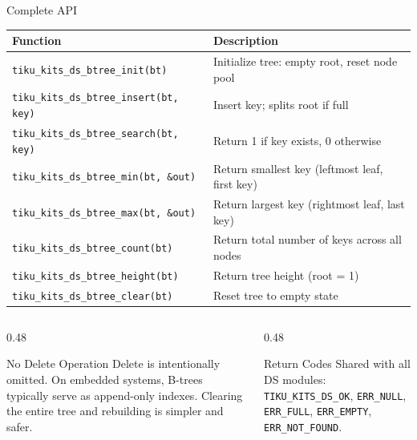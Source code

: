 \documentclass[aspectratio=169, 10pt]{beamer}
\begin{document}
\begin{frame}[fragile]{Complete API}
\begin{table}
\centering
\small
\begin{tabular}{@{}lp{8cm}@{}}
\toprule
\textbf{Function} & \textbf{Description} \\
\midrule
\texttt{tiku\_kits\_ds\_btree\_init(bt)}
  & Initialize tree: empty root, reset node pool \\
\texttt{tiku\_kits\_ds\_btree\_insert(bt, key)}
  & Insert key; splits root if full \\
\texttt{tiku\_kits\_ds\_btree\_search(bt, key)}
  & Return 1 if key exists, 0 otherwise \\
\midrule
\texttt{tiku\_kits\_ds\_btree\_min(bt, \&out)}
  & Return smallest key (leftmost leaf, first key) \\
\texttt{tiku\_kits\_ds\_btree\_max(bt, \&out)}
  & Return largest key (rightmost leaf, last key) \\
\texttt{tiku\_kits\_ds\_btree\_count(bt)}
  & Return total number of keys across all nodes \\
\texttt{tiku\_kits\_ds\_btree\_height(bt)}
  & Return tree height (root = 1) \\
\midrule
\texttt{tiku\_kits\_ds\_btree\_clear(bt)}
  & Reset tree to empty state \\
\bottomrule
\end{tabular}
\end{table}

\vspace{0.3em}
\begin{columns}[T]
\begin{column}{0.48\textwidth}
\begin{alertblock}{No Delete Operation}
Delete is intentionally omitted. On embedded systems, B-trees
typically serve as append-only indexes. Clearing the entire
tree and rebuilding is simpler and safer.
\end{alertblock}
\end{column}
\begin{column}{0.48\textwidth}
\begin{block}{Return Codes}
Shared with all DS modules:
\texttt{TIKU\_KITS\_DS\_OK},
\texttt{ERR\_NULL},
\texttt{ERR\_FULL},
\texttt{ERR\_EMPTY},
\texttt{ERR\_NOT\_FOUND}.
\end{block}
\end{column}
\end{columns}
\end{frame}
\end{document}
